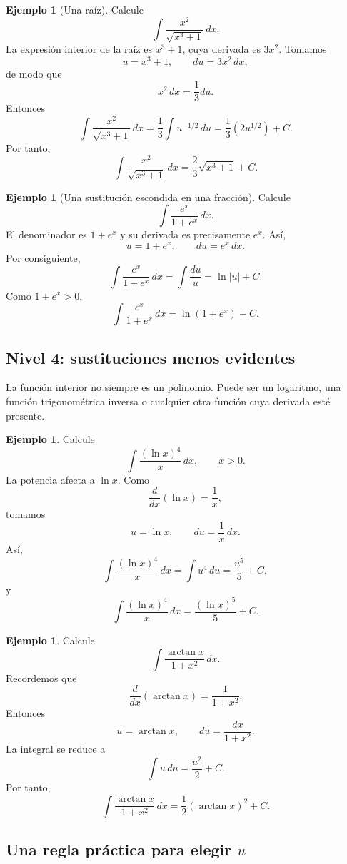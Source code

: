 \documentclass[12pt]{article}
\theoremstyle{definition}\newtheorem{definicion}[teorema]{Definición}\newtheorem{ejemplo}[teorema]{Ejemplo}\newtheorem{ejercicio}[teorema]{Ejercicio}
\theoremstyle{remark}\newtheorem*{observacion}{Observación}\newtheorem*{advertencia}{Advertencia}\newtheorem*{estrategia}{Estrategia}
\begin{document}
\begin{ejemplo}[Una raíz]
Calcule
\[
\int\frac{x^2}{\sqrt{x^3+1}}\,dx.
\]
La expresión interior de la raíz es $x^3+1$, cuya derivada es $3x^2$. Tomamos
\[
u=x^3+1,\qquad du=3x^2\,dx,
\]
de modo que
\[
x^2\,dx=\frac13du.
\]
Entonces
\[
\int\frac{x^2}{\sqrt{x^3+1}}\,dx
=\frac13\int u^{-1/2}\,du
=\frac13(2u^{1/2})+C.
\]
Por tanto,
\[
\boxed{\int\frac{x^2}{\sqrt{x^3+1}}\,dx=\frac23\sqrt{x^3+1}+C.}
\]
\end{ejemplo}

\begin{ejemplo}[Una sustitución escondida en una fracción]
Calcule
\[
\int\frac{e^x}{1+e^x}\,dx.
\]
El denominador es $1+e^x$ y su derivada es precisamente $e^x$. Así,
\[
u=1+e^x,\qquad du=e^x\,dx.
\]
Por consiguiente,
\[
\int\frac{e^x}{1+e^x}\,dx
=\int\frac{du}{u}
=\ln|u|+C.
\]
Como $1+e^x>0$,
\[
\boxed{\int\frac{e^x}{1+e^x}\,dx=\ln(1+e^x)+C.}
\]
\end{ejemplo}

\subsection{Nivel 4: sustituciones menos evidentes}

La función interior no siempre es un polinomio. Puede ser un logaritmo, una función trigonométrica inversa o cualquier otra función cuya derivada esté presente.

\begin{ejemplo}
Calcule
\[
\int\frac{(\ln x)^4}{x}\,dx,\qquad x>0.
\]
La potencia afecta a $\ln x$. Como
\[
\frac{d}{dx}(\ln x)=\frac1x,
\]
tomamos
\[
u=\ln x,\qquad du=\frac1x\,dx.
\]
Así,
\[
\int\frac{(\ln x)^4}{x}\,dx
=\int u^4\,du
=\frac{u^5}{5}+C,
\]
y
\[
\boxed{\int\frac{(\ln x)^4}{x}\,dx=\frac{(\ln x)^5}{5}+C.}
\]
\end{ejemplo}

\begin{ejemplo}
Calcule
\[
\int\frac{\arctan x}{1+x^2}\,dx.
\]
Recordemos que
\[
\frac{d}{dx}(\arctan x)=\frac1{1+x^2}.
\]
Entonces
\[
u=\arctan x,\qquad du=\frac{dx}{1+x^2}.
\]
La integral se reduce a
\[
\int u\,du=\frac{u^2}{2}+C.
\]
Por tanto,
\[
\boxed{\int\frac{\arctan x}{1+x^2}\,dx=\frac12(\arctan x)^2+C.}
\]
\end{ejemplo}

\subsection{Una regla práctica para elegir $u$}
\end{document}
